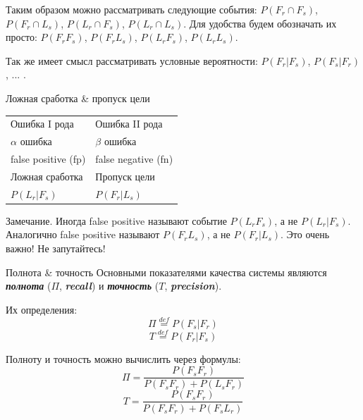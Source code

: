 \documentclass{beamer}
\newcommand{\termdef}[1]{\textbf{\textit{#1}}}
\newcommand{\auditorium}[1]{\color{red}{\textbf{#1}}}
\begin{document}
  \begin{frame}
  Таким образом можно рассматривать следующие события: 
  $P(F_r \cap F_s)$, $P(F_r \cap L_s)$, $P(L_r \cap F_s)$, $P(L_r \cap L_s)$. 
  Для удобства будем обозначать их просто: 
  $P(F_r  F_s)$, $P(F_r L_s)$, $P(L_r F_s)$, $P(L_r L_s)$. 
  
  Так же имеет смысл рассматривать условные вероятности: 
  $P(F_r | F_s)$, 
  $P(F_s | F_r)$, ... .
  \end{frame}

  \begin{frame}{Ложная сработка \& пропуск цели} 
  \begin{center}
		\LARGE
		\begin{tabular}{l|l}
		 	Ошибка I рода & Ошибка II рода \\
		 	$\alpha$ ошибка & $\beta$ ошибка \\
		 	false positive (fp) & false negative (fn) \\ 
		 	Ложная сработка  & Пропуск цели \\
		 	$P(L_r|F_s)$ & $P(F_r |L_s)$\\
		\end{tabular}
  \end{center}
   
    \begin{block}{Замечание.}
 	Иногда false positive называют событие $P(L_r F_s)$, а не $P(L_r | F_s)$.
 	Аналогично false positive называют $P(F_r  L_s)$, а не $P(F_r | L_s)$.
 	Это очень важно! Не запутайтесь!
    \end{block}
  \end{frame}
 
  \begin{frame}{Полнота \& точность}\label{frame:presicion_recall}
  Основными показателями качества системы являются 
  \termdef{полнота} ($\Pi$, \termdef{recall}) 
  и 
  \termdef{точность} ($T$, \termdef{precision}).
  
  Их определения:
  \begin{equation}
  \Pi \stackrel{def}{=} P(F_s | F_r)
  \end{equation}
  \begin{equation}
  T \stackrel{def}{=} P(F_r | F_s)
  \end{equation}
  
  Полноту и точность можно вычислить через формулы:
  \begin{equation}\label{eq:recall_calc}
  \Pi = \frac{P(F_s  F_r)}{P(F_s F_r) + P(L_s F_r)}
  \end{equation}
  \begin{equation}\label{eq:precision_calc}
  T = \frac{P(F_s F_r)}{P(F_s F_r) + P(F_s L_r)}
  \end{equation}
  \auditorium{ДЗ: докажите эти формулы}
  \end{frame}
  
\end{document}
